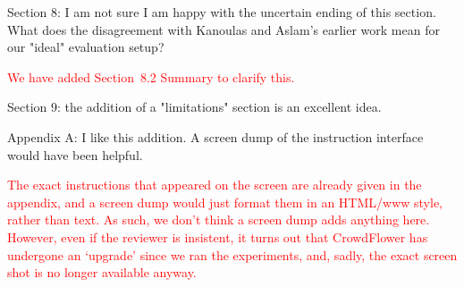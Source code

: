\documentclass{article}
\newcommand{\comment}[1]{\vspace{1em} \textcolor{red}{{#1}} \vspace{1em}}
\begin{document}
Section 8: I am not sure I am happy with the uncertain ending of
this section. What does the disagreement with Kanoulas and Aslam's
earlier work mean for our "ideal" evaluation setup?

\comment{We have added Section~8.2 Summary to clarify this.}

Section 9: the addition of a "limitations" section is an excellent
idea.

Appendix A: I like this addition. A screen dump of the instruction
interface would have been helpful.

\comment{The exact instructions that appeared on the screen are already given in the appendix, and a screen
dump would just format them in an HTML/www style, rather than text. As such, we 
don't think a screen dump adds anything here. However, even if the reviewer is insistent, it turns 
out that CrowdFlower has undergone an `upgrade' since we
ran the experiments, and, sadly, the exact screen shot is no longer available anyway.
}
\end{document}
